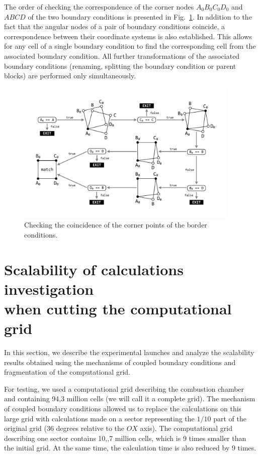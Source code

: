 \documentclass[
11pt,%
tightenlines,%
twoside,%
onecolumn,%
nofloats,%
nobibnotes,%
nofootinbib,%
superscriptaddress,%
noshowpacs,%
centertags]%
{revtex4}
\begin{document}
The order of checking the correspondence of the corner nodes $A_0B_0C_0D_0$ and $ABCD$ of the two boundary conditions is presented in Fig.~\ref{fig:match2}.
In addition to the fact that the angular nodes of a pair of boundary conditions coincide, a correspondence between their coordinate systems is also established.
This allows for any cell of a single boundary condition to find the corresponding cell from the associated boundary condition.
All further transformations of the associated boundary conditions (renaming, splitting the boundary condition or parent blocks) are performed only simultaneously.

\begin{figure}[h]
\setcaptionmargin{5mm}
\onelinecaptionstrue
\includegraphics[width=0.95\textwidth]{pics/match2.pdf}
\caption{Checking the coincidence of the corner points of the border conditions.}
\label{fig:match2}
\end{figure}

\section{Scalability of calculations investigation \protect\\ when cutting the computational grid}

In this section, we describe the experimental launches and analyze the scalability results obtained using the mechanisms of coupled boundary conditions and fragmentation of the computational grid.

For testing, we used a computational grid describing the combustion chamber and containing 94,3 million cells (we will call it a complete grid).
The mechanism of coupled boundary conditions allowed us to replace the calculations on this large grid with calculations made on a sector representing the $1/10$ part of the original grid (36 degrees relative to the $OX$ axis).
The computational grid describing one sector contains 10,,7 million cells, which is 9 times smaller than the initial grid.
At the same time, the calculation time is also reduced by 9 times.
\end{document}
